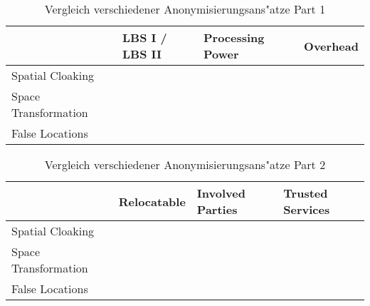 \begin{table}[!t]
\renewcommand{\arraystretch}{1.3}
\caption{Vergleich verschiedener Anonymisierungsans"atze Part 1}
\label{table:vergleich1}
\centering
    \begin{tabular}{l|lll}
    	~                    & LBS I / LBS II & Processing Power & Overhead \\ \hline
    	Spatial Cloaking     & ~              & ~                & ~        \\
    	Space Transformation & ~              & ~                & ~        \\
    	False Locations      & ~              & ~                & ~        \\
    \end{tabular}
\end{table}

\begin{table}[!t]
\renewcommand{\arraystretch}{1.3}

\caption{Vergleich verschiedener Anonymisierungsans"atze Part 2}
\label{table:vergleich2}
	\centering
    \begin{tabular}{l|lll}
    	~                    & Relocatable & Involved Parties & Trusted Services \\ \hline
    	Spatial Cloaking     & ~           & ~                & ~                \\
    	Space Transformation & ~           & ~                & ~                \\
    	False Locations      & ~           & ~                & ~                \\
    \end{tabular}
\end{table}